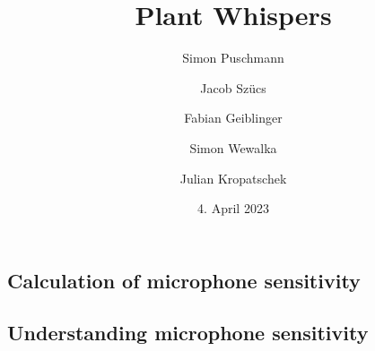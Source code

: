 \documentclass[minted, en]{thesis}
\title{Plant Whispers}
\author{Simon Puschmann}{5AHIT}{Elektronik Sensor und Messtechnik}
\author{Jacob Szücs}{5AHIT}{Filtern und vorbereiten der Daten}
\author{Fabian Geiblinger}{5AHIT}{Speichern und Zuweisen der Daten}
\author{Simon Wewalka}{5AHIT}{Auswerden der Daten}
\author{Julian Kropatschek}{5AHIT}{Benutzeroberfläche}
\date{4. April 2023}
\begin{document}

\tableofcontents\glsresetall
\newpage\pagestyle{fancy}






















\begin{appendices}
\chapter{Calculation of microphone sensitivity}
\section{Understanding microphone sensitivity}
\end{appendices}

\end{document}

